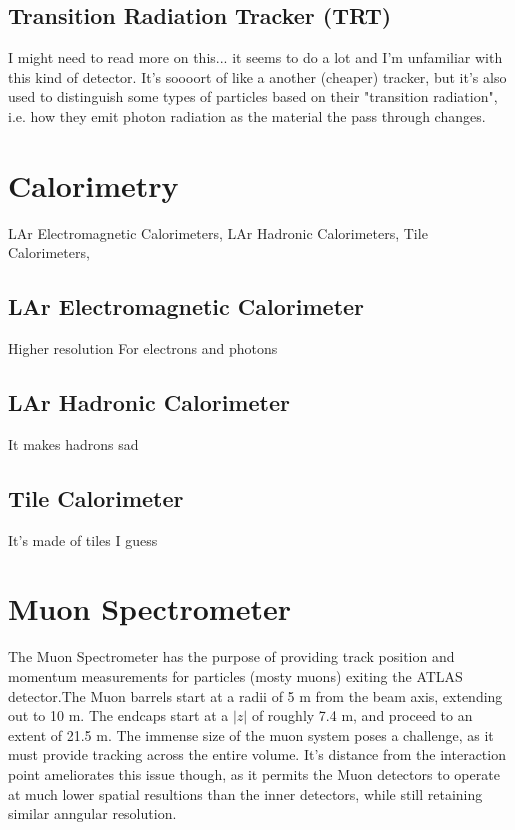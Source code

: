     \subsection{Transition Radiation Tracker (TRT)}
        I might need to read more on this... it seems to do a lot and I'm unfamiliar with this kind of detector.
        It's soooort of like a another (cheaper) tracker,
        but it's also used to distinguish some types of particles based on their "transition radiation",
        i.e. how they emit photon radiation as the material the pass through changes.



\section{Calorimetry}
    LAr Electromagnetic Calorimeters,
    LAr Hadronic Calorimeters,
    Tile Calorimeters,


    \subsection{LAr Electromagnetic Calorimeter}
        Higher resolution
        For electrons and photons


    \subsection{LAr Hadronic Calorimeter}
        It makes hadrons sad


    \subsection{Tile Calorimeter}
        It's made of tiles I guess


\section{Muon Spectrometer} 
    The Muon Spectrometer has the purpose of providing track position and momentum measurements for particles (mosty muons) exiting the ATLAS detector.The Muon barrels start at a radii of 5 m from the beam axis, extending out to 10 m. The endcaps start at a $|z|$ of roughly 7.4 m, and proceed to an extent of 21.5 m. The immense size of the muon system poses a challenge, as it must provide tracking across the entire volume. It's distance from the interaction point ameliorates this issue though, as it permits the Muon detectors to operate at much lower spatial resultions than the inner detectors, while still retaining similar anngular resolution.

